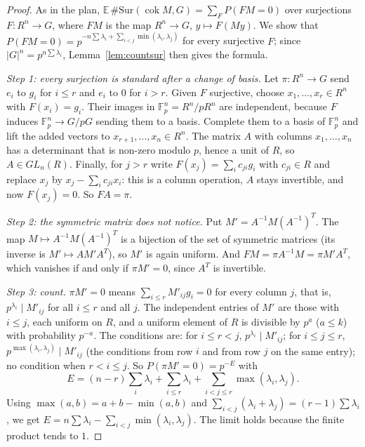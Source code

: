 \begin{proof}
As in the plan, $\mathbb E\,\#\mathrm{Sur}(\operatorname{cok}M,G)=\sum_{F}P(FM=0)$ over surjections $F:R^n\to G$, where $FM$ is the map $R^n\to G$, $y\mapsto F(My)$. We show that $P(FM=0)=p^{-n\sum\lambda_i+\sum_{i<j}\min(\lambda_i,\lambda_j)}$ for every surjective $F$; since $|G|^n=p^{n\sum\lambda_i}$, Lemma~\ref{lem:countsur} then gives the formula.

\emph{Step 1: every surjection is standard after a change of basis.} Let $\pi:R^n\to G$ send $e_i$ to $g_i$ for $i\le r$ and $e_i$ to $0$ for $i>r$. Given $F$ surjective, choose $x_1,\dots,x_r\in R^n$ with $F(x_i)=g_i$. Their images in $\mathbb F_p^n=R^n/pR^n$ are independent, because $F$ induces $\mathbb F_p^n\to G/pG$ sending them to a basis. Complete them to a basis of $\mathbb F_p^n$ and lift the added vectors to $x_{r+1},\dots,x_n\in R^n$. The matrix $A$ with columns $x_1,\dots,x_n$ has a determinant that is non-zero modulo $p$, hence a unit of $R$, so $A\in GL_n(R)$. Finally, for $j>r$ write $F(x_j)=\sum_ic_{ji}g_i$ with $c_{ji}\in R$ and replace $x_j$ by $x_j-\sum_ic_{ji}x_i$: this is a column operation, $A$ stays invertible, and now $F(x_j)=0$. So $FA=\pi$.

\emph{Step 2: the symmetric matrix does not notice.} Put $M'=A^{-1}M(A^{-1})^{T}$. The map $M\mapsto A^{-1}M(A^{-1})^T$ is a bijection of the set of symmetric matrices (its inverse is $M'\mapsto AM'A^T$), so $M'$ is again uniform. And $FM=\pi A^{-1}M=\pi M'A^T$, which vanishes if and only if $\pi M'=0$, since $A^T$ is invertible.

\emph{Step 3: count.} $\pi M'=0$ means $\sum_{i\le r}M'_{ij}g_i=0$ for every column $j$, that is, $p^{\lambda_i}\mid M'_{ij}$ for all $i\le r$ and all $j$. The independent entries of $M'$ are those with $i\le j$, each uniform on $R$, and a uniform element of $R$ is divisible by $p^a$ ($a\le k$) with probability $p^{-a}$. The conditions are: for $i\le r<j$, $p^{\lambda_i}\mid M'_{ij}$; for $i\le j\le r$, $p^{\max(\lambda_i,\lambda_j)}\mid M'_{ij}$ (the conditions from row $i$ and from row $j$ on the same entry); no condition when $r<i\le j$. So $P(\pi M'=0)=p^{-E}$ with
\[
E=(n-r)\sum_i\lambda_i+\sum_{i\le r}\lambda_i+\sum_{i<j\le r}\max(\lambda_i,\lambda_j).
\]
Using $\max(a,b)=a+b-\min(a,b)$ and $\sum_{i<j}(\lambda_i+\lambda_j)=(r-1)\sum\lambda_i$, we get $E=n\sum\lambda_i-\sum_{i<j}\min(\lambda_i,\lambda_j)$. The limit holds because the finite product tends to $1$.
\end{proof}

